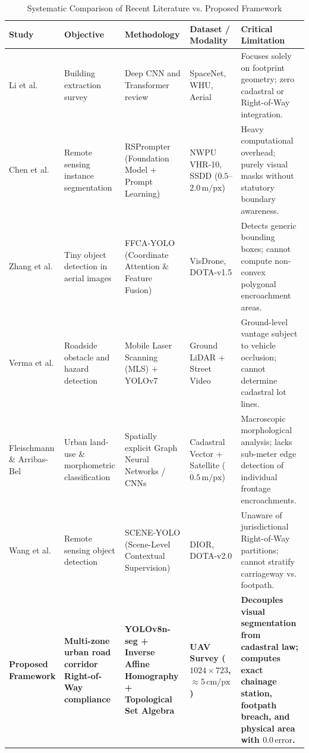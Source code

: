 \documentclass[conference]{IEEEtran}
\begin{document}
\begin{table}[!t]
\caption{Systematic Comparison of Recent Literature vs. Proposed Framework}
\label{tab:literature}
\centering
\footnotesize
\renewcommand{\arraystretch}{1.35}
\begin{tabular}{p{2.8cm} p{3.6cm} p{3.8cm} p{2.8cm} p{4.3cm}}
\toprule
\textbf{Study} & \textbf{Objective} & \textbf{Methodology} & \textbf{Dataset / Modality} & \textbf{Critical Limitation} \\
\midrule
Li et al. \cite{li2024review} & Building extraction survey & Deep CNN and Transformer review & SpaceNet, WHU, Aerial & Focuses solely on footprint geometry; zero cadastral or Right-of-Way integration. \\
Chen et al. \cite{chen2024rsprompter} & Remote sensing instance segmentation & RSPrompter (Foundation Model + Prompt Learning) & NWPU VHR-10, SSDD ($0.5$--$2.0\,\text{m/px}$) & Heavy computational overhead; purely visual masks without statutory boundary awareness. \\
Zhang et al. \cite{zhang2024ffca} & Tiny object detection in aerial images & FFCA-YOLO (Coordinate Attention \& Feature Fusion) & VisDrone, DOTA-v1.5 & Detects generic bounding boxes; cannot compute non-convex polygonal encroachment areas. \\
Verma et al. \cite{verma2024urban} & Roadside obstacle and hazard detection & Mobile Laser Scanning (MLS) + YOLOv7 & Ground LiDAR + Street Video & Ground-level vantage subject to vehicle occlusion; cannot determine cadastral lot lines. \\
Fleischmann \& Arribas-Bel \cite{fleischmann2024spatially} & Urban land-use \& morphometric classification & Spatially explicit Graph Neural Networks / CNNs & Cadastral Vector + Satellite ($0.5\,\text{m/px}$) & Macroscopic morphological analysis; lacks sub-meter edge detection of individual frontage encroachments. \\
Wang et al. \cite{wang2025scene} & Remote sensing object detection & SCENE-YOLO (Scene-Level Contextual Supervision) & DIOR, DOTA-v2.0 & Unaware of jurisdictional Right-of-Way partitions; cannot stratify carriageway vs. footpath. \\
\midrule
\textbf{Proposed Framework} & \textbf{Multi-zone urban road corridor Right-of-Way compliance} & \textbf{YOLOv8n-seg + Inverse Affine Homography + Topological Set Algebra} & \textbf{UAV Survey ($1024 \times 723$, $\approx 5\,\text{cm/px}$)} & \textbf{Decouples visual segmentation from cadastral law; computes exact chainage station, footpath breach, and physical area with $0.0\,\text{error}$.} \\
\bottomrule
\end{tabular}
\end{table}
\end{document}
